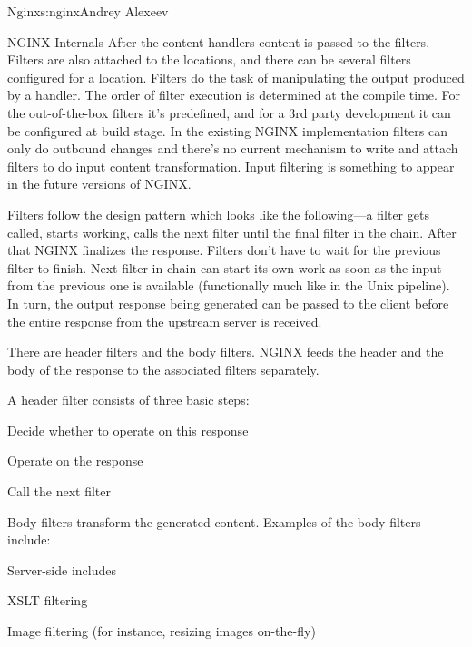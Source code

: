 \begin{aosachapter}{Nginx}{s:nginx}{Andrey Alexeev}
\begin{aosasect1}{NGINX Internals}
After the content handlers content is passed to the filters. Filters
are also attached to the locations, and there can be several filters
configured for a location. Filters do the task of manipulating the
output produced by a handler. The order of filter execution is
determined at the compile time. For the out-of-the-box filters it's
predefined, and for a 3rd party development it can be configured at
build stage. In the existing NGINX implementation filters can only do
outbound changes and there's no current mechanism to write and attach
filters to do input content transformation. Input filtering is
something to appear in the future versions of NGINX.

Filters follow the design pattern which looks like the following---a
filter gets called, starts working, calls the next filter until the
final filter in the chain. After that NGINX finalizes the
response. Filters don't have to wait for the previous filter to
finish. Next filter in chain can start its own work as soon as the
input from the previous one is available (functionally much like in
the Unix pipeline). In turn, the output response being generated can
be passed to the client before the entire response from the upstream
server is received.

There are header filters and the body filters. NGINX feeds the header
and the body of the response to the associated filters separately.

A header filter consists of three basic steps:

\begin{aosaitemize}

\item Decide whether to operate on this response

\item Operate on the response

\item Call the next filter

\end{aosaitemize}

Body filters transform the generated content. Examples of the body
filters include:

\begin{aosaitemize}

\item Server-side includes

\item XSLT filtering

\item Image filtering (for instance, resizing images on-the-fly)


\end{aosaitemize}
\end{aosasect1}
\end{aosachapter}
